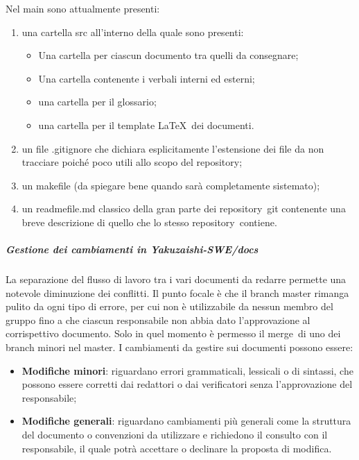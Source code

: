         Nel main sono attualmente presenti:
        \begin{enumerate}
            \item una cartella src all'interno della quale sono presenti:
            \begin{itemize}
                \item Una cartella per ciascun documento tra quelli da consegnare;
                \item Una cartella contenente i verbali interni ed esterni;
                \item una cartella per il glossario;
                \item una cartella per il template \LaTeX\ dei documenti.
            \end{itemize}
            \item un file .gitignore che dichiara esplicitamente l’estensione dei file da non tracciare poiché poco utili allo scopo del repository\glo;
            \item un makefile (da spiegare bene quando sarà completamente sistemato);
            \item un readmefile.md classico della gran parte dei repository\glo\ git contenente una breve descrizione di quello che lo stesso repository\glo\ contiene.
        \end{enumerate}
            \subparagraph{Gestione dei cambiamenti in Yakuzaishi-SWE/docs}
            La separazione del flusso di lavoro tra i vari documenti da redarre permette una notevole diminuzione dei conflitti. Il punto focale è che il branch master rimanga pulito da ogni tipo di errore, per cui non è utilizzabile da nessun membro del gruppo fino a che ciascun responsabile non abbia dato l’approvazione al corrispettivo documento. Solo in quel momento è permesso il merge\glo\ di uno dei branch minori nel master. I cambiamenti da gestire sui documenti possono essere:
            \begin{itemize}
                \item \textbf{Modifiche minori}: riguardano errori grammaticali, lessicali o di sintassi, che possono essere corretti dai redattori o dai verificatori senza l’approvazione del responsabile;
                \item \textbf{Modifiche generali}: riguardano cambiamenti più generali come la struttura del documento o convenzioni da utilizzare e richiedono il consulto con il responsabile, il quale potrà accettare o declinare la proposta di modifica.
            \end{itemize}

